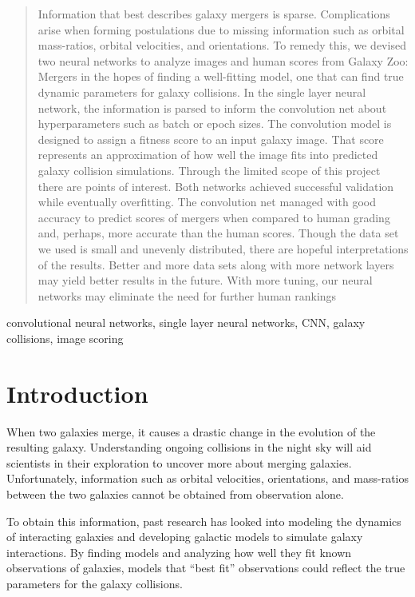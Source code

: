 \documentclass[conference]{IEEEtran}
\begin{document}
\begin{abstract}
Information that best describes galaxy mergers is sparse.  Complications arise when forming postulations due to missing information such as orbital mass-ratios, orbital velocities, and orientations.  To remedy this, we devised two neural networks to analyze images and human scores from Galaxy Zoo: Mergers in the hopes of finding a well-fitting model, one that can find true dynamic parameters for galaxy collisions.  In the single layer neural network, the information is parsed to inform the convolution net about hyperparameters such as batch or epoch sizes.  The convolution model is designed to assign a fitness score to an input galaxy image.  That score represents an approximation of how well the image fits into predicted galaxy collision simulations.  Through the limited scope of this project there are points of interest.  Both networks achieved successful validation while eventually overfitting.  The convolution net managed with good accuracy to predict scores of mergers when compared to human grading and, perhaps, more accurate than the human scores. Though the data set we used is small and unevenly distributed, there are hopeful interpretations of the results.  Better and more data sets along with more network layers may yield better results in the future.  With more tuning, our neural networks may eliminate the need for further human rankings
\end{abstract}



\begin{IEEEkeywords}
convolutional neural networks, single layer neural networks, CNN, galaxy collisions, image scoring
\end{IEEEkeywords}

\section{Introduction}

When two galaxies merge, it causes a drastic change in the
evolution of the resulting galaxy. Understanding ongoing
collisions in the night sky will aid scientists in their exploration
to uncover more about merging galaxies. Unfortunately,
information such as orbital velocities, orientations, and mass-ratios between the two galaxies cannot be obtained from
observation alone.

To obtain this information, past research has looked into
modeling the dynamics of interacting galaxies and developing
galactic models to simulate galaxy interactions. By finding
models and analyzing how well they fit known observations of
galaxies, models that “best fit” observations could reflect the
true parameters for the galaxy collisions.
\end{document}
